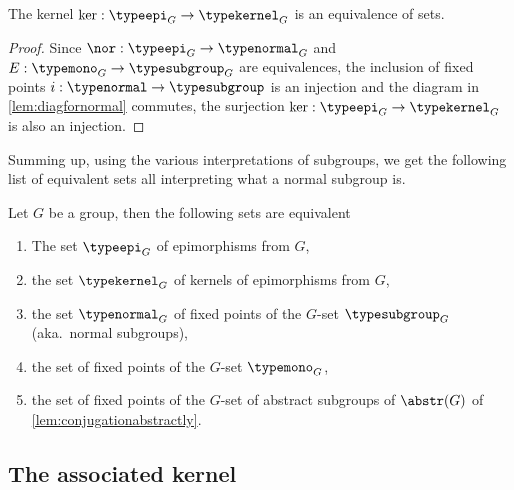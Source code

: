 \begin{corollary}
  \label{cor:normalisnormal}
  The kernel $\ker:\typeepi_G\to \typekernel_G$ is an equivalence of sets.
\end{corollary}
\begin{proof} Since $\nor:\typeepi_G\to\typenormal_G$ and $E:\typemono_G\to\typesubgroup_G$ are equivalences, the inclusion of fixed points $i:\typenormal\to\typesubgroup$ is an injection and the diagram
in \cref{lem:diagfornormal} commutes, the surjection $\ker:\typeepi_G\to\typekernel_G$ is also an injection.
\end{proof}


Summing up, using the various interpretations of subgroups, we get the following list of equivalent sets all interpreting what a normal subgroup is.
\begin{lemma}
  \label{lem:characterizations of normal}
  Let $G$ be a group, then the following sets are equivalent
\begin{enumerate}
\item The set $\typeepi_G$ of epimorphisms from $G$,
\item the set $\typekernel_G$ of kernels of epimorphisms from $G$,
\item the set $\typenormal_G$ of fixed points of the $G$-set $\typesubgroup_G$ (aka.~normal subgroups),
\item the set of fixed points of the $G$-set $\typemono_G$,
\item the set of fixed points of the $G$-set of abstract subgroups of $\abstr(G)$ of \cref{lem:conjugationabstractly}.
\end{enumerate}
\end{lemma}


\subsection{The associated kernel}
\label{sec:assker}

